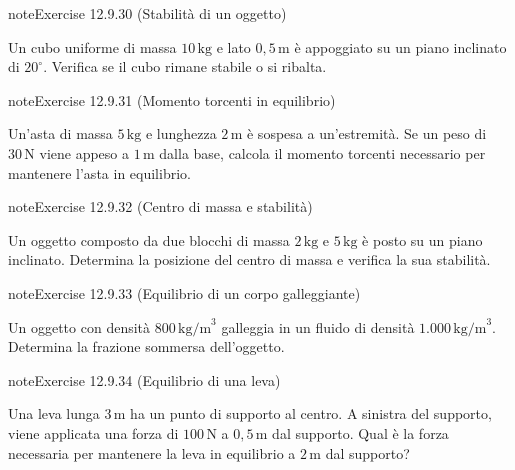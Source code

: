 \documentclass[letterpaper,10pt,italian]{jupyterBook}
\begin{document}
\begin{sphinxadmonition}{note}{Exercise 12.9.30 (Stabilità di un oggetto)}



\sphinxAtStartPar
Un cubo uniforme di massa \(10 \, \text{kg}\) e lato \(0,5 \, \text{m}\) è appoggiato su un piano inclinato di \(20^\circ\). Verifica se il cubo rimane stabile o si ribalta.
\end{sphinxadmonition}
 \label{exercise:ch/mechanics/dynamics-problems-exercise-30}

\begin{sphinxadmonition}{note}{Exercise 12.9.31 (Momento torcenti in equilibrio)}



\sphinxAtStartPar
Un’asta di massa \(5 \, \text{kg}\) e lunghezza \(2 \, \text{m}\) è sospesa a un’estremità. Se un peso di \(30 \, \text{N}\) viene appeso a \(1 \, \text{m}\) dalla base, calcola il momento torcenti necessario per mantenere l’asta in equilibrio.
\end{sphinxadmonition}
 \label{exercise:ch/mechanics/dynamics-problems-exercise-31}

\begin{sphinxadmonition}{note}{Exercise 12.9.32 (Centro di massa e stabilità)}



\sphinxAtStartPar
Un oggetto composto da due blocchi di massa \(2 \, \text{kg}\) e \(5 \, \text{kg}\) è posto su un piano inclinato. Determina la posizione del centro di massa e verifica la sua stabilità.
\end{sphinxadmonition}
 \label{exercise:ch/mechanics/dynamics-problems-exercise-32}

\begin{sphinxadmonition}{note}{Exercise 12.9.33 (Equilibrio di un corpo galleggiante)}



\sphinxAtStartPar
Un oggetto con densità \(800 \, \text{kg/m}^3\) galleggia in un fluido di densità \(1.000 \, \text{kg/m}^3\). Determina la frazione sommersa dell’oggetto.
\end{sphinxadmonition}
 \label{exercise:ch/mechanics/dynamics-problems-exercise-33}

\begin{sphinxadmonition}{note}{Exercise 12.9.34 (Equilibrio di una leva)}



\sphinxAtStartPar
Una leva lunga \(3 \, \text{m}\) ha un punto di supporto al centro. A sinistra del supporto, viene applicata una forza di \(100 \, \text{N}\) a \(0,5 \, \text{m}\) dal supporto. Qual è la forza necessaria per mantenere la leva in equilibrio a \(2 \, \text{m}\) dal supporto?
\end{sphinxadmonition}
 \label{exercise:ch/mechanics/dynamics-problems-exercise-34}
\end{document}
